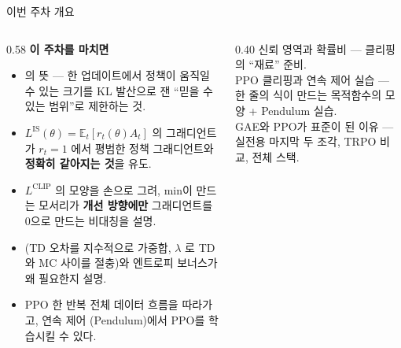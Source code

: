 \begin{frame}{이번 주차 개요}
  \small
  \begin{columns}[T]
    \begin{column}{0.58\textwidth}
      \textbf{이 주차를 마치면}
      \begin{itemize}
        \item {}의 뜻 — 한 업데이트에서 정책이 움직일 수
          있는 크기를 KL 발산으로 잰 ``믿을 수 있는 범위''로 제한하는 것.
        \item $L^{\mathrm{IS}}(\theta)=\mathbb{E}_t[r_t(\theta)A_t]$ 의
          그래디언트가 $r_t=1$ 에서 평범한 정책 그래디언트와
          \textbf{정확히 같아지는 것}을 유도.
        \item $L^{\mathrm{CLIP}}$ 의 모양을 손으로 그려, min이 만드는
          모서리가 \textbf{개선 방향에만} 그래디언트를 0으로 만드는
          비대칭을 설명.
        \item {}(TD 오차를 지수적으로 가중합, $\lambda$ 로 TD와
          MC 사이를 절충)와 엔트로피 보너스가 왜 필요한지 설명.
        \item PPO 한 반복 전체 데이터 흐름을 따라가고, 연속 제어
          (Pendulum)에서 PPO를 학습시킬 수 있다.
      \end{itemize}
    \end{column}
    \begin{column}{0.40\textwidth}
       신뢰 영역과 확률비 — 클리핑의 ``재료'' 준비.
      \\[0.5em]
       PPO 클리핑과 연속 제어 실습 — 한 줄의 식이 만드는
      목적함수의 모양 + Pendulum 실습.
      \\[0.5em]
       GAE와 PPO가 표준이 된 이유 — 실전용 마지막 두 조각,
      TRPO 비교, 전체 스택.
    \end{column}
  \end{columns}
\end{frame}
